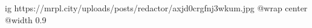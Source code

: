  
 
 
 
 

\ifcmt
  ig https://mrpl.city/uploads/posts/redactor/axjd0crgfnj3wkum.jpg
  @wrap center
  @width 0.9
\fi
